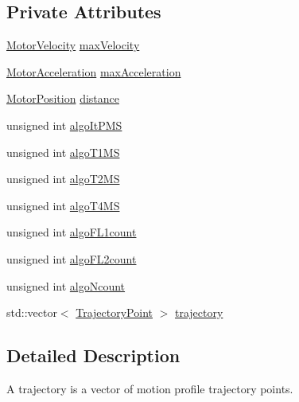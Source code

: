 \subsection*{Private Attributes}
\begin{DoxyCompactItemize}
\item 
\hyperlink{classMotorVelocity}{Motor\-Velocity} \hyperlink{classTrajectory_a7101fccd21bccbf6ff66ae855fc6fb04}{max\-Velocity}
\item 
\hyperlink{classMotorAcceleration}{Motor\-Acceleration} \hyperlink{classTrajectory_aff0221bf2932e63c3b1211cacb273dc6}{max\-Acceleration}
\item 
\hyperlink{classMotorPosition}{Motor\-Position} \hyperlink{classTrajectory_adca462e882c89640c83cb546294ec6c8}{distance}
\item 
unsigned int \hyperlink{classTrajectory_a6fcb37a2f4d0ba6c79bacbe74c8c8291}{algo\-It\-P\-M\-S}
\item 
unsigned int \hyperlink{classTrajectory_a47305aeb6de4a4102406db6111e155d6}{algo\-T1\-M\-S}
\item 
unsigned int \hyperlink{classTrajectory_ada35c0fd4e7de5e9eec428e800d045e6}{algo\-T2\-M\-S}
\item 
unsigned int \hyperlink{classTrajectory_a7e8f6a0075794037354ad92416131be3}{algo\-T4\-M\-S}
\item 
unsigned int \hyperlink{classTrajectory_a6821dd2945918f2307a4004319050369}{algo\-F\-L1count}
\item 
unsigned int \hyperlink{classTrajectory_a56c679a5deca7efadc9c957f3e418e7b}{algo\-F\-L2count}
\item 
unsigned int \hyperlink{classTrajectory_a130dbb1855dd1ac27f89c6f9c30fe019}{algo\-Ncount}
\item 
std\-::vector$<$ \hyperlink{classTrajectoryPoint}{Trajectory\-Point} $>$ \hyperlink{classTrajectory_a159e6800353ba91aa66f304de8fa177c}{trajectory}
\end{DoxyCompactItemize}


\subsection{Detailed Description}
A trajectory is a vector of motion profile trajectory points. 

